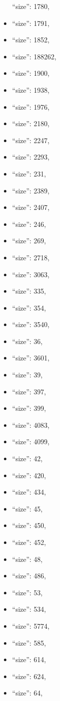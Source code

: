 \begin{itemize}
  ``size'': 1780,
\item
  ``size'': 1791,
\item
  ``size'': 1852,
\item
  ``size'': 188262,
\item
  ``size'': 1900,
\item
  ``size'': 1938,
\item
  ``size'': 1976,
\item
  ``size'': 2180,
\item
  ``size'': 2247,
\item
  ``size'': 2293,
\item
  ``size'': 231,
\item
  ``size'': 2389,
\item
  ``size'': 2407,
\item
  ``size'': 246,
\item
  ``size'': 269,
\item
  ``size'': 2718,
\item
  ``size'': 3063,
\item
  ``size'': 335,
\item
  ``size'': 354,
\item
  ``size'': 3540,
\item
  ``size'': 36,
\item
  ``size'': 3601,
\item
  ``size'': 39,
\item
  ``size'': 397,
\item
  ``size'': 399,
\item
  ``size'': 4083,
\item
  ``size'': 4099,
\item
  ``size'': 42,
\item
  ``size'': 420,
\item
  ``size'': 434,
\item
  ``size'': 45,
\item
  ``size'': 450,
\item
  ``size'': 452,
\item
  ``size'': 48,
\item
  ``size'': 486,
\item
  ``size'': 53,
\item
  ``size'': 534,
\item
  ``size'': 5774,
\item
  ``size'': 585,
\item
  ``size'': 614,
\item
  ``size'': 624,
\item
  ``size'': 64,

\end{itemize}

